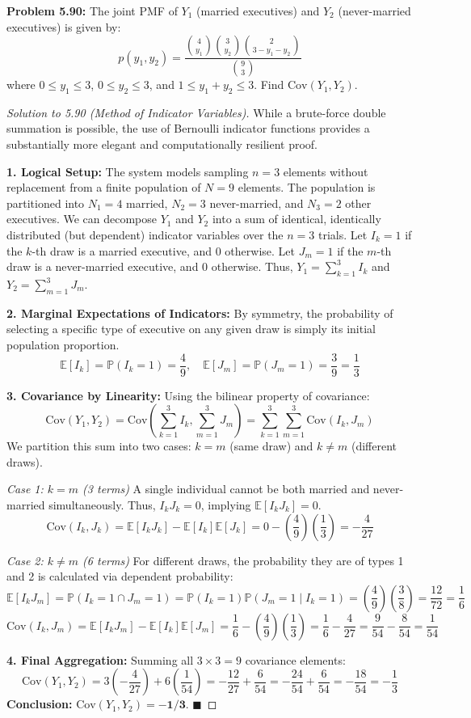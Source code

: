 \documentclass[11pt, a4paper]{article}
\theoremstyle{definition}
\theoremstyle{remark}
\newcommand{\E}{\mathbb{E}}
\newcommand{\Prob}{\mathbb{P}}
\newcommand{\Cov}{\mathrm{Cov}}
\begin{document}
\vspace{1em}
\noindent\textbf{Problem 5.90:} The joint PMF of $Y_1$ (married executives) and $Y_2$ (never-married executives) is given by:
\[
p(y_1, y_2) = \frac{\binom{4}{y_1} \binom{3}{y_2} \binom{2}{3 - y_1 - y_2}}{\binom{9}{3}}
\]
where $0 \le y_1 \le 3$, $0 \le y_2 \le 3$, and $1 \le y_1 + y_2 \le 3$. Find $\Cov(Y_1, Y_2)$.

\begin{proof}[Solution to 5.90 (Method of Indicator Variables)]
While a brute-force double summation is possible, the use of Bernoulli indicator functions provides a substantially more elegant and computationally resilient proof.

\textbf{1. Logical Setup:}
The system models sampling $n=3$ elements without replacement from a finite population of $N=9$ elements. The population is partitioned into $N_1=4$ married, $N_2=3$ never-married, and $N_3=2$ other executives. We can decompose $Y_1$ and $Y_2$ into a sum of identical, identically distributed (but dependent) indicator variables over the $n=3$ trials.
Let $I_k = 1$ if the $k$-th draw is a married executive, and $0$ otherwise.
Let $J_m = 1$ if the $m$-th draw is a never-married executive, and $0$ otherwise.
Thus, $Y_1 = \sum_{k=1}^3 I_k$ and $Y_2 = \sum_{m=1}^3 J_m$.

\textbf{2. Marginal Expectations of Indicators:}
By symmetry, the probability of selecting a specific type of executive on any given draw is simply its initial population proportion.
\[
\E[I_k] = \Prob(I_k = 1) = \frac{4}{9}, \quad \E[J_m] = \Prob(J_m = 1) = \frac{3}{9} = \frac{1}{3}
\]

\textbf{3. Covariance by Linearity:}
Using the bilinear property of covariance:
\[
\Cov(Y_1, Y_2) = \Cov\left( \sum_{k=1}^3 I_k, \sum_{m=1}^3 J_m \right) = \sum_{k=1}^3 \sum_{m=1}^3 \Cov(I_k, J_m)
\]
We partition this sum into two cases: $k=m$ (same draw) and $k \neq m$ (different draws).

\textit{Case 1: $k = m$ (3 terms)}
A single individual cannot be both married and never-married simultaneously. Thus, $I_k J_k = 0$, implying $\E[I_k J_k] = 0$.
\[
\Cov(I_k, J_k) = \E[I_k J_k] - \E[I_k]\E[J_k] = 0 - \left(\frac{4}{9}\right)\left(\frac{1}{3}\right) = -\frac{4}{27}
\]

\textit{Case 2: $k \neq m$ (6 terms)}
For different draws, the probability they are of types 1 and 2 is calculated via dependent probability:
\[
\E[I_k J_m] = \Prob(I_k = 1 \cap J_m = 1) = \Prob(I_k = 1) \Prob(J_m = 1 \mid I_k = 1) = \left(\frac{4}{9}\right)\left(\frac{3}{8}\right) = \frac{12}{72} = \frac{1}{6}
\]
\[
\Cov(I_k, J_m) = \E[I_k J_m] - \E[I_k]\E[J_m] = \frac{1}{6} - \left(\frac{4}{9}\right)\left(\frac{1}{3}\right) = \frac{1}{6} - \frac{4}{27} = \frac{9}{54} - \frac{8}{54} = \frac{1}{54}
\]

\textbf{4. Final Aggregation:}
Summing all $3 \times 3 = 9$ covariance elements:
\[
\Cov(Y_1, Y_2) = 3\left(-\frac{4}{27}\right) + 6\left(\frac{1}{54}\right) = -\frac{12}{27} + \frac{6}{54} = -\frac{24}{54} + \frac{6}{54} = -\frac{18}{54} = -\frac{1}{3}
\]
\textbf{Conclusion:} $\Cov(Y_1, Y_2) = \mathbf{-1/3}$. $\blacksquare$
\end{proof}
\end{document}
